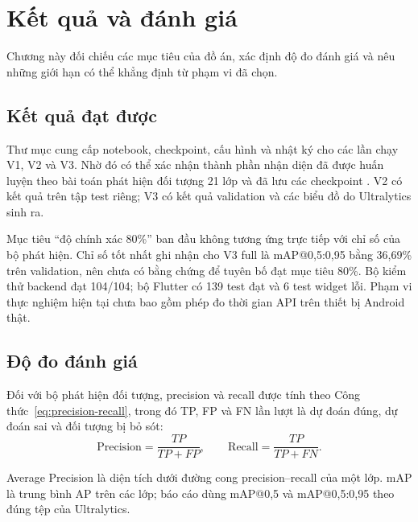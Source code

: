 \chapter{Kết quả và đánh giá}
\label{ch:ketqua}

\begin{muctieu}
Chương này đối chiếu các mục tiêu của đồ án, xác định độ đo đánh giá và nêu
những giới hạn có thể khẳng định từ phạm vi đã chọn.
\end{muctieu}

\section{Kết quả đạt được}

Thư mục  cung cấp notebook, checkpoint, cấu hình
và nhật ký cho các lần chạy V1, V2 và V3. Nhờ đó có thể xác nhận thành phần
nhận diện đã được huấn luyện theo bài toán phát hiện đối tượng 21 lớp và đã
lưu các checkpoint . V2 có kết quả trên tập test riêng; V3 có
kết quả validation và các biểu đồ do Ultralytics sinh ra.

Mục tiêu ``độ chính xác 80\%'' ban đầu không tương ứng trực tiếp với chỉ số
của bộ phát hiện. Chỉ số tốt nhất ghi nhận cho V3 full là mAP@0,5:0,95 bằng
36,69\% trên validation, nên chưa có bằng chứng để tuyên bố đạt mục tiêu
80\%. Bộ kiểm thử backend đạt 104/104; bộ Flutter có 139 test đạt và 6 test
widget lỗi. Phạm vi thực nghiệm hiện tại chưa bao gồm phép đo thời gian API
trên thiết bị Android thật.

\section{Độ đo đánh giá}

Đối với bộ phát hiện đối tượng, precision và recall được tính theo
Công thức~\eqref{eq:precision-recall}, trong đó TP, FP và FN lần lượt là dự
đoán đúng, dự đoán sai và đối tượng bị bỏ sót:
\begin{equation}
\mathrm{Precision}=\frac{TP}{TP+FP},\qquad
\mathrm{Recall}=\frac{TP}{TP+FN}.
\label{eq:precision-recall}
\end{equation}

Average Precision là diện tích dưới đường cong precision--recall của một
lớp. mAP là trung bình AP trên các lớp; báo cáo dùng mAP@0,5 và
mAP@0,5:0,95 theo đúng tệp  của Ultralytics.

